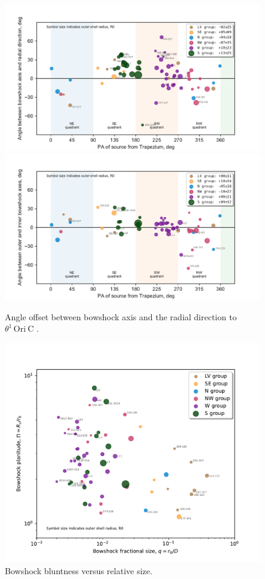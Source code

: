 \documentclass[iop, apj]{emulateapj}
\newcommand\thC{\ensuremath{\theta^1\,\mathrm{Ori~C}}}
\begin{document}
\begin{figure}
  \centering
  \includegraphics[width=\linewidth]{will-PA-vs-PA-class}
  \includegraphics[width=\linewidth]{will-PA-out-vs-in-class}
  \caption{Angle offset between bowshock axis and the radial direction to \thC{} .}
  \label{fig:PA-v-PA}
\end{figure}
\begin{figure}
  \centering
  \includegraphics[width=\linewidth]{will-A-vs-q-class}
  \caption{Bowshock bluntness versus relative size.}
  \label{fig:A-v-q}
\end{figure}
\end{document}
